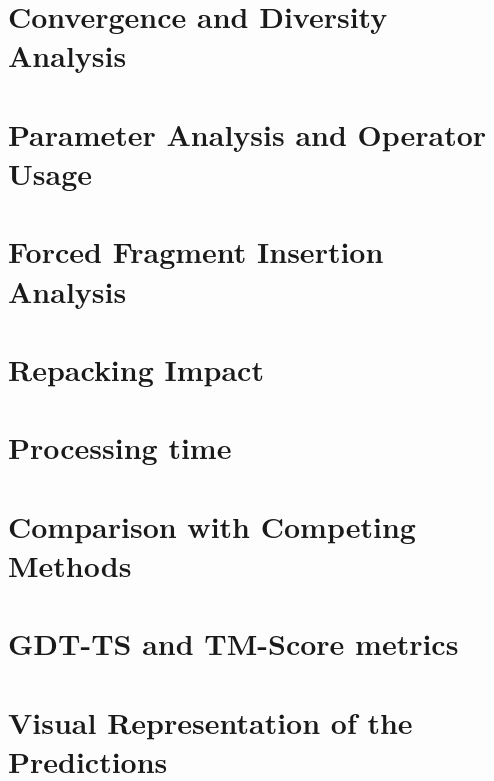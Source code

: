 \section{Convergence and Diversity Analysis}

\section{Parameter Analysis and Operator Usage}

\section{Forced Fragment Insertion Analysis}

\section{Repacking Impact}

\section{Processing time}

\section{Comparison with Competing Methods}

\section{GDT-TS and TM-Score metrics}

\section{Visual Representation of the Predictions}

